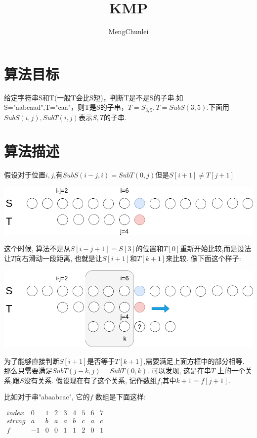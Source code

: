 \documentclass{article}
\title{KMP}
\author{MengChunlei}
\begin{document}
\maketitle
\section{算法目标}
给定字符串S和T(一般T会比S短)，判断T是不是S的子串.如S="aabcaad",T="caa"，则T是S的子串，$T=S_{3,5},T=SubS(3,5)$.下面用$SubS(i,j),SubT(i,j)$表示$S,T$的子串. \par
\section{算法描述}
假设对于位置$i,j$,有$SubS(i-j,i)=SubT(0,j)$但是$S[i+1]\neq T[j+1]$\par
\includegraphics[scale=0.35]{pic1.png} \par
这个时候, 算法不是从$S[i-j+1]=S[3]$的位置和$T[0]$重新开始比较,而是设法让$T$向右滑动一段距离, 也就是让$S[i+1]$和$T[k+1]$来比较. 像下面这个样子: \par
\includegraphics[scale=0.35]{pic2.png} \par
为了能够直接判断$S[i+1]$是否等于$T[k+1]$,需要满足上面方框中的部分相等. 那么只需要满足$SubT(j-k,j)=SubT(0,k)$. 可以发现, 这是在串$T$ 上的一个关系,跟$S$没有关系. 假设现在有了这个关系, 记作数组$f$,其中$k+1=f[j+1]$.  \par

比如对于串"abaabcac", 它的$f$ 数组是下面这样: \par

$\begin{matrix} 
index & 0 & 1 & 2 & 3 & 4 & 5 & 6 & 7 \\ 
string & a & b & a & a & b & c & a & c \\ 
f & -1 & 0 & 0 & 1 & 1 & 2 & 0 & 1 \\
\end{matrix}$
\end{document}

